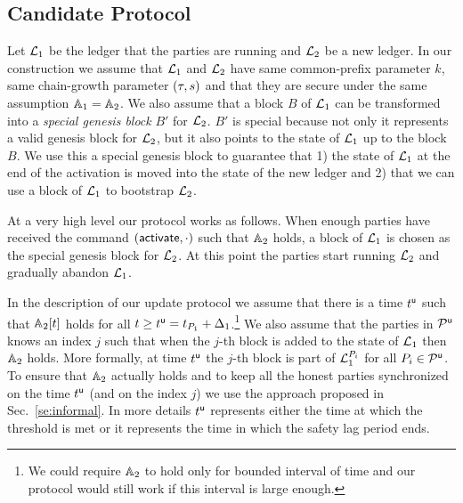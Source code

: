 \subsection{Candidate Protocol}

Let $\mathcal{L}_1$ be the ledger that the parties are running and $\mathcal{L}_2$ be a new ledger.
In our construction we assume that $\mathcal{L}_1$ and $\mathcal{L}_2$ have same common-prefix parameter $k$, same chain-growth parameter $(\tau, s)$ and that they are secure under the same assumption $\mathbb{A}_1=\mathbb{A}_2$. We also assume that a block $B$ of $\mathcal{L}_1$ can be transformed into a \emph{special genesis block} $B'$ for $\mathcal{L}_2$. $B'$ is special because not only
it represents a valid genesis block for $\mathcal{L}_2$, but it also points to the state of $\mathcal{L}_1$ up to the block $B$. 
We use this a special genesis block to guarantee that 1) the state of $\mathcal{L}_1$ at the end of the activation is moved into the state of the new ledger
and 2) that we can use a block of $\mathcal{L}_1$ to bootstrap $\mathcal{L}_2$.

At a very high level our protocol works as follows. When enough parties have received the command $(\mathsf{activate},\cdot)$ such that $\mathbb{A}_2$ holds,
a block of $\mathcal{L}_1$ is chosen as the special genesis block for $\mathcal{L}_2$. At this point the parties start running $\mathcal{L}_2$ and gradually abandon 
$\mathcal{L}_1$.

In the description of our update protocol we assume that there is a time $t^{\mathsf{u}}$ such that $\mathbb{A}_2[t]$ holds for all $t\geq t^{\mathsf{u}}=t_{P_1}+\Delta_1$.\footnote{We could require $\mathbb{A}_2$ to
hold only for bounded interval of time and our protocol would still work if this interval is large enough.}
We also assume that the parties in $\mathcal{P}^\mathsf{u}$ knows an index $j$ such that when the $j$-th block is added to the state of $\mathcal{L}_1$ then $\mathbb{A}_2$ holds. 
More formally, at time $t^{\mathsf{u}}$ the $j$-th block is part of $\mathcal{L}_1^{P_i}$ for all $P_i\in\mathcal{P}^\mathsf{u}$.
To ensure that $\mathbb{A}_2$ actually holds and to keep all the honest parties synchronized on the time $t^{\mathsf{u}}$ (and on the index $j$) we use the approach proposed in Sec.~\ref{se:informal}.
In more details $t^{\mathsf{u}}$ represents either the time at which the threshold is met or it represents the time in which the safety lag period ends.
 


